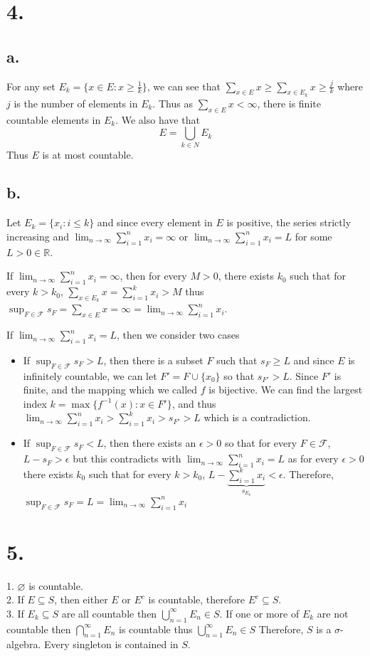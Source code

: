 \documentclass[11pt]{article}
\theoremstyle{mystyle}
\theoremstyle{definition}
\begin{document}
\section*{4.}
\subsection*{a.}
For any set $E_k = \{x \in E: x \ge \frac{1}{k} \}$, we can see that $\sum_{x \in E}x \ge \sum_{x \in E_k} x \ge \frac{j}{k}$ where $j$ is the number of elements in $E_k$. Thus as $\sum_{x \in E} x < \infty$, there is finite countable elements in $E_k$. We also have that 
\[
  E = \bigcup_{k \in N} E_k
\]
Thus $E$ is at most countable.
\subsection*{b.}
Let $E_k = \{x_i: i \le k\}$ and since every element in $E$ is positive, the series strictly increasing and $\lim_{n \to \infty} \sum_{i=1}^n x_i = \infty$ or $\lim_{n \to \infty} \sum_{i=1}^n x_i = L$ for some $L >0 \in \mathbb{R}$. 

If $\lim_{n \to \infty} \sum_{i=1}^n x_i = \infty$, then for every $M > 0$, there exists $k_0$ such that for every $k>k_0$, $\sum_{x \in E_k} x= \sum_{i=1}^k x_i > M$ thus $\sup_{F \in \mathcal{F}} s_F = \sum_{x \in E} x = \infty = \lim_{n \to \infty} \sum_{i=1}^n x_i$.

If $\lim_{n \to \infty} \sum_{i=1}^n x_i = L$, then we consider two cases 
\begin{itemize}
  \item If $\sup_{F \in \mathcal{F}} s_F > L$, then there is a subset $F$ such that $s_F \ge L$ and since $E$ is infinitely countable, we can let $F' = F \cup \{x_0\}$ so that $s_{F'} > L$. Since $F'$ is finite, and the mapping which we called $f$ is bijective. We can find the largest index $k = \max\{f^{-1}(x): x \in F' \}$, and thus $\lim_{n \to \infty} \sum_{i=1}^n x_i > \sum_{i=1}^k x_i > s_{F'} > L$ which is a contradiction.
  \item If $\sup_{F \in \mathcal{F}} s_F < L$, then there exists an $\epsilon >0$ so that for every $F \in \mathcal{F}$, $L - s_F > \epsilon$ but this contradicts with $\lim_{n\to \infty} \sum_{i=1}^n x_i = L$ as for every $\epsilon >0$ there exists $k_0$ such that for every $k>k_0$, $L - \underbrace{\sum_{i=1}^k x_i}_{s_{E_k}}< \epsilon$. 
    Therefore, $\sup_{F \in \mathcal{F}} s_F = L = \lim_{n \to \infty} \sum_{i=1}^n x_i$
\end{itemize}



\newpage
\section*{5.}
1. $\varnothing$ is countable. \\
2. If $E \subseteq S$, then either $E$ or $E^c$ is countable, therefore $E^c \subseteq S$. \\
3. If $E_k \subseteq S$ are all countable then $\bigcup_{n=1}^\infty E_n \in S$. If one or more of $E_k$ are not countable then $\bigcap_{n=1}^\infty E_n$ is countable thus $\bigcup_{n=1}^\infty E_n \in S$
Therefore, $S$ is a $\sigma$-algebra.
Every singleton is contained in $S$. 
\end{document}
